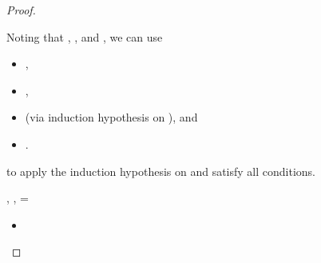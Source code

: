 \begin{lemma}
\begin{proof}
\begin{case}[B-BetaClosure]
\begin{itemize}
\begin{subcase}[T-App]
                    Noting that 
      \issubtypein{}  { {} {\x{}}}{\ty{}},
       {\thenprop {\prop{}}},
       {\elseprop {\prop{}}}
      and
       {\object{}},
                    we can use
         \begin{itemize}
           \item
        \judgementrewrite {\propenvc{}}
                          {}
                          {}
               {}
                          {}
                          {}, 
           \item
              ,
           \item
{} (via induction hypothesis on {}), and
           \item 
         {}
         {\val{}}.
         \end{itemize}
         to apply the induction hypothesis on {} and satisfy
         all conditions.

\end{subcase}
\end{itemize}
\end{case}

\begin{case}[B-Delta]
  \opsem {\openv{}} {} {\const{}},
  \opsem {\openv{}} {} {},
   = \val{}

\begin{itemize}
  \item[]
\begin{subcase}[T-App]
  \ 


\end{subcase}
\end{itemize}
\end{case}
\end{proof}
\end{lemma}
